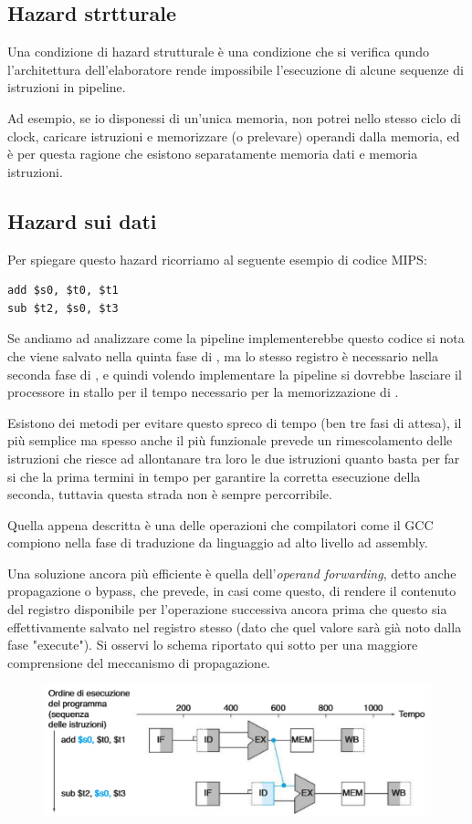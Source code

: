 \documentclass[class=book, crop=false, oneside]{standalone}
\begin{document}
\subsection{Hazard strtturale}
Una condizione di hazard strutturale è una condizione che si verifica qundo l'architettura dell’elaboratore rende impossibile l’esecuzione di alcune sequenze di istruzioni in pipeline.

Ad esempio, se io disponessi di un’unica memoria, non potrei nello stesso ciclo di clock, caricare istruzioni e memorizzare (o prelevare) operandi dalla memoria, ed è per questa ragione che esistono separatamente memoria dati e memoria istruzioni.

\subsection{Hazard sui dati}
Per spiegare questo hazard ricorriamo al seguente esempio di codice MIPS:
\begin{verbatim}
add $s0, $t0, $t1
sub $t2, $s0, $t3
\end{verbatim}
Se andiamo ad analizzare come la pipeline implementerebbe questo codice si nota che  viene salvato nella quinta fase di , ma lo stesso registro è necessario nella seconda fase di , e quindi volendo implementare la pipeline si dovrebbe lasciare il processore in stallo per il tempo necessario per la memorizzazione di .

Esistono dei metodi per evitare questo spreco di tempo (ben tre fasi di attesa), il più semplice ma spesso anche il più funzionale prevede un rimescolamento delle istruzioni che riesce ad allontanare tra loro le due istruzioni quanto basta per far si che la prima termini in tempo per garantire la corretta esecuzione della seconda, tuttavia questa strada non è sempre percorribile.

Quella appena descritta è una delle operazioni che compilatori come il GCC compiono nella fase di traduzione da linguaggio ad alto livello ad assembly.

Una soluzione ancora più efficiente è quella dell'\emph{operand forwarding}, detto anche propagazione o bypass, che prevede, in casi come questo, di rendere il contenuto del registro  disponibile per l'operazione successiva ancora prima che questo sia effettivamente salvato nel registro stesso (dato che quel valore sarà già noto dalla fase "execute").
Si osservi lo schema riportato qui sotto per una maggiore comprensione del meccanismo di propagazione.
\begin{figure}
	\centering
	\includegraphics[width=.8\textwidth,keepaspectratio]{propagazione.png}
\end{figure}
\end{document}
